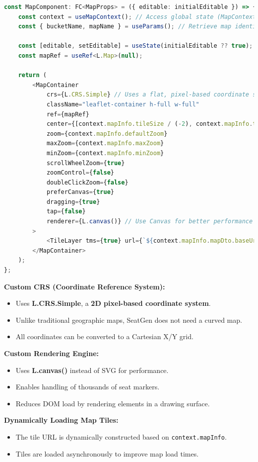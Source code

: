 \begin{lstlisting}[language=TypeScript, caption=Initializing Leaflet Map in React, label=lst:react-leaflet]
const MapComponent: FC<MapProps> = ({ editable: initialEditable }) => {
    const context = useMapContext(); // Access global state (MapContext)
    const { bucketName, mapName } = useParams(); // Retrieve map identifiers from URL params

    const [editable, setEditable] = useState(initialEditable ?? true);
    const mapRef = useRef<L.Map>(null);

    return (
        <MapContainer
            crs={L.CRS.Simple} // Uses a flat, pixel-based coordinate system
            className="leaflet-container h-full w-full"
            ref={mapRef}
            center={[context.mapInfo.tileSize / (-2), context.mapInfo.tileSize / (2)]}
            zoom={context.mapInfo.defaultZoom}
            maxZoom={context.mapInfo.maxZoom}
            minZoom={context.mapInfo.minZoom}
            scrollWheelZoom={true}
            zoomControl={false}
            doubleClickZoom={false}
            preferCanvas={true}
            dragging={true}
            tap={false}
            renderer={L.canvas()} // Use Canvas for better performance
        >
            <TileLayer tms={true} url={`${context.mapInfo.mapDto.baseUrl}/{z}/{x}/{y}.png`} />
        </MapContainer>
    );
};
\end{lstlisting}

\textbf{Custom CRS (Coordinate Reference System):}
\begin{itemize}
    \item Uses \textbf{L.CRS.Simple}, a \textbf{2D pixel-based coordinate system}.
    \item Unlike traditional geographic maps, SeatGen does not need a curved map.
    \item All coordinates can be converted to a Cartesian X/Y grid.
\end{itemize}

\textbf{Custom Rendering Engine:}
\begin{itemize}
    \item Uses \textbf{L.canvas()} instead of SVG for performance.
    \item Enables handling of thousands of seat markers.
    \item Reduces DOM load by rendering elements in a drawing surface.
\end{itemize}

\textbf{Dynamically Loading Map Tiles:}
\begin{itemize}
    \item The tile URL is dynamically constructed based on \texttt{context.mapInfo}.
    \item Tiles are loaded asynchronously to improve map load times.
\end{itemize}


